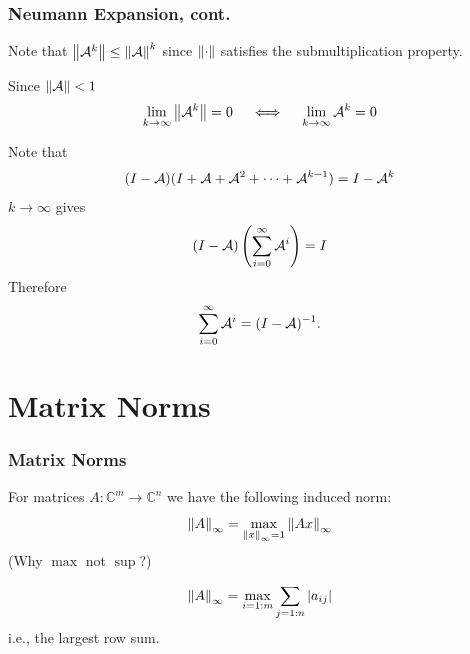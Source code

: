 \documentclass{beamer}
\begin{document}
\begin{frame}\frametitle{Neumann Expansion, cont.}
	Note that $\left\| \mathcal{A}^k \right\| \leq \left\| \mathcal{A} \right\|^{k}$ since $\left\| \cdot \right\|$ satisfies the submultiplication property. 
	
	\vfill 
	
	Since $\left\|\mathcal{A} \right\| < 1$
	\[ 
	\lim_{k\to \infty} \left\| \mathcal{A}^k \right\| = 0 \quad \iff \quad \lim_{k \to \infty}\mathcal{A}^k = 0 
	\]
	
	\vfill
	
	Note that
	\[ 
	(I - \mathcal{A}) ( I + \mathcal{A} + \mathcal{A}^2 + \cdots + \mathcal{A}^{k-1}) = I-\mathcal{A}^k 
	\]
	$k \to \infty$ gives
	\[ 
	(I-\mathcal{A})\left( \sum_{i = 0}^{\infty} \mathcal{A}^i \right) = I
	\]
	Therefore 
	\[ 
	\sum_{i=0}^{\infty} \mathcal{A}^i = (I-\mathcal{A})^{-1}. 
	\]
\end{frame}

\section{Matrix Norms}
\frame{\sectionpage}

\begin{frame}\frametitle{Matrix Norms}
	For matrices $A: \mathbb{C}^m \to \mathbb{C}^n$ we have the following induced norm:  
	\[ 
	\left\| A \right\|_{\infty} = \max_{\left\| x \right\|_{\infty} = 1} \left\| Ax \right\|_{\infty} 
	\]
	(Why $\max$ not $\sup$?)
	
	\vfill
	
	\begin{lemma}
	\[ 
	\left\| A \right\|_{\infty} = \max_{i=1:m} \sum_{j=1:n} \left|a_{ij}\right|
	\]
	i.e., the largest row sum.
	\end{lemma}
\end{frame}
\end{document}
